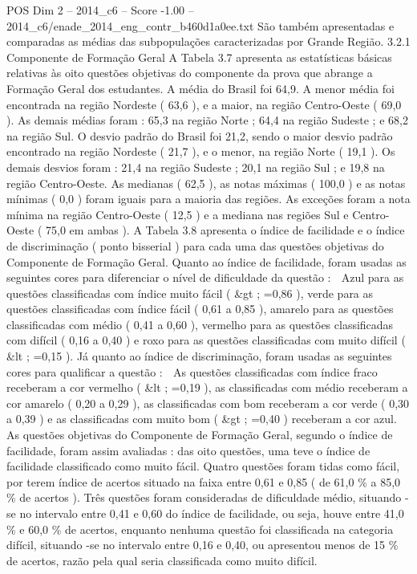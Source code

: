 \begin{textsample}{POS Dim 2 – 2014\_c6 – Score -1.00 – 2014\_c6/enade\_2014\_eng\_contr\_b460d1a0ee.txt}
São também apresentadas e comparadas as médias das subpopulações caracterizadas por Grande Região. 3.2.1 Componente de Formação Geral A Tabela 3.7 apresenta as estatísticas básicas relativas às oito questões objetivas do componente da prova que abrange a Formação Geral dos estudantes.
A média do Brasil foi 64,9.
A menor média foi encontrada na região Nordeste ( 63,6 ), e a maior, na região Centro-Oeste ( 69,0 ).
As demais médias foram : 65,3 na região Norte ; 64,4 na região Sudeste ; e 68,2 na região Sul.
O desvio padrão do Brasil foi 21,2, sendo o maior desvio padrão encontrado na região Nordeste ( 21,7 ), e o menor, na região Norte ( 19,1 ).
Os demais desvios foram : 21,4 na região Sudeste ; 20,1 na região Sul ; e 19,8 na região Centro-Oeste.
As medianas ( 62,5 ), as notas máximas ( 100,0 ) e as notas mínimas ( 0,0 ) foram iguais para a maioria das regiões.
As exceções foram a nota mínima na região Centro-Oeste ( 12,5 ) e a mediana nas regiões Sul e Centro-Oeste ( 75,0 em ambas ).
A Tabela 3.8 apresenta o índice de facilidade e o índice de discriminação ( ponto bisserial ) para cada uma das questões objetivas do Componente de Formação Geral.
Quanto ao índice de facilidade, foram usadas as seguintes cores para diferenciar o nível de dificuldade da questão :  Azul para as questões classificadas com índice muito fácil ( \&gt ; =0,86 ), verde para as questões classificadas com índice fácil ( 0,61 a 0,85 ), amarelo para as questões classificadas com médio ( 0,41 a 0,60 ), vermelho para as questões classificadas com difícil ( 0,16 a 0,40 ) e roxo para as questões classificadas com muito difícil ( \&lt ; =0,15 ).
Já quanto ao índice de discriminação, foram usadas as seguintes cores para qualificar a questão :  As questões classificadas com índice fraco receberam a cor vermelho ( \&lt ; =0,19 ), as classificadas com médio receberam a cor amarelo ( 0,20 a 0,29 ), as classificadas com bom receberam a cor verde ( 0,30 a 0,39 ) e as classificadas com muito bom ( \&gt ; =0,40 ) receberam a cor azul.
As questões objetivas do Componente de Formação Geral, segundo o índice de facilidade, foram assim avaliadas : das oito questões, uma teve o índice de facilidade classificado como muito fácil.
Quatro questões foram tidas como fácil, por terem índice de acertos situado na faixa entre 0,61 e 0,85 ( de 61,0 \% a 85,0 \% de acertos ).
Três questões foram consideradas de dificuldade médio, situando -se no intervalo entre 0,41 e 0,60 do índice de facilidade, ou seja, houve entre 41,0 \% e 60,0 \% de acertos, enquanto nenhuma questão foi classificada na categoria difícil, situando -se no intervalo entre 0,16 e 0,40, ou apresentou menos de 15 \% de acertos, razão pela qual seria classificada como muito difícil.

\end{textsample}
